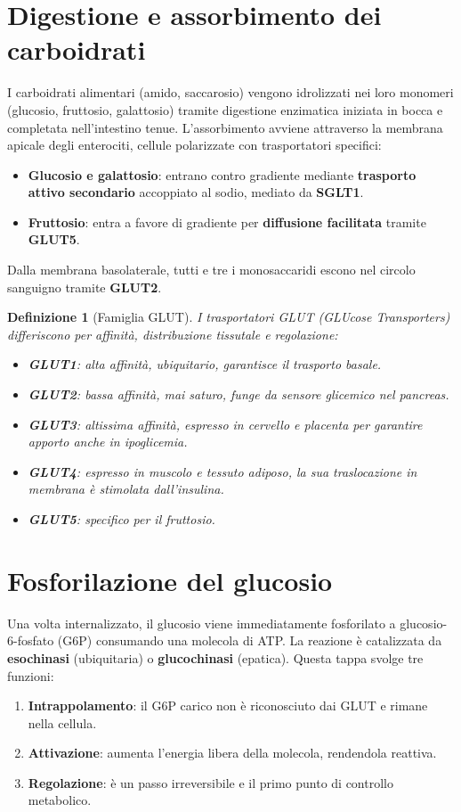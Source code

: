 \documentclass[12pt,a4paper]{report}
\newtheorem{definizione}{Definizione}[section]
\begin{document}
\section{Digestione e assorbimento dei carboidrati}
I carboidrati alimentari (amido, saccarosio) vengono idrolizzati nei loro monomeri (glucosio, fruttosio, galattosio) tramite digestione enzimatica iniziata in bocca e completata nell'intestino tenue. L'assorbimento avviene attraverso la membrana apicale degli enterociti, cellule polarizzate con trasportatori specifici:
\begin{itemize}
\item \textbf{Glucosio e galattosio}: entrano contro gradiente mediante \textbf{trasporto attivo secondario} accoppiato al sodio, mediato da \textbf{SGLT1}.
\item \textbf{Fruttosio}: entra a favore di gradiente per \textbf{diffusione facilitata} tramite \textbf{GLUT5}.
\end{itemize}
Dalla membrana basolaterale, tutti e tre i monosaccaridi escono nel circolo sanguigno tramite \textbf{GLUT2}.
\begin{definizione}[Famiglia GLUT]
I trasportatori GLUT (GLUcose Transporters) differiscono per affinità, distribuzione tissutale e regolazione:
\begin{itemize}
\item \textbf{GLUT1}: alta affinità, ubiquitario, garantisce il trasporto basale.
\item \textbf{GLUT2}: bassa affinità, mai saturo, funge da sensore glicemico nel pancreas.
\item \textbf{GLUT3}: altissima affinità, espresso in cervello e placenta per garantire apporto anche in ipoglicemia.
\item \textbf{GLUT4}: espresso in muscolo e tessuto adiposo, la sua traslocazione in membrana è stimolata dall'insulina.
\item \textbf{GLUT5}: specifico per il fruttosio.
\end{itemize}
\end{definizione}

\section{Fosforilazione del glucosio}
Una volta internalizzato, il glucosio viene immediatamente fosforilato a glucosio-6-fosfato (G6P) consumando una molecola di ATP. La reazione è catalizzata da \textbf{esochinasi} (ubiquitaria) o \textbf{glucochinasi} (epatica).
Questa tappa svolge tre funzioni:
\begin{enumerate}
\item \textbf{Intrappolamento}: il G6P carico non è riconosciuto dai GLUT e rimane nella cellula.
\item \textbf{Attivazione}: aumenta l'energia libera della molecola, rendendola reattiva.
\item \textbf{Regolazione}: è un passo irreversibile e il primo punto di controllo metabolico.
\end{enumerate}
\end{document}
